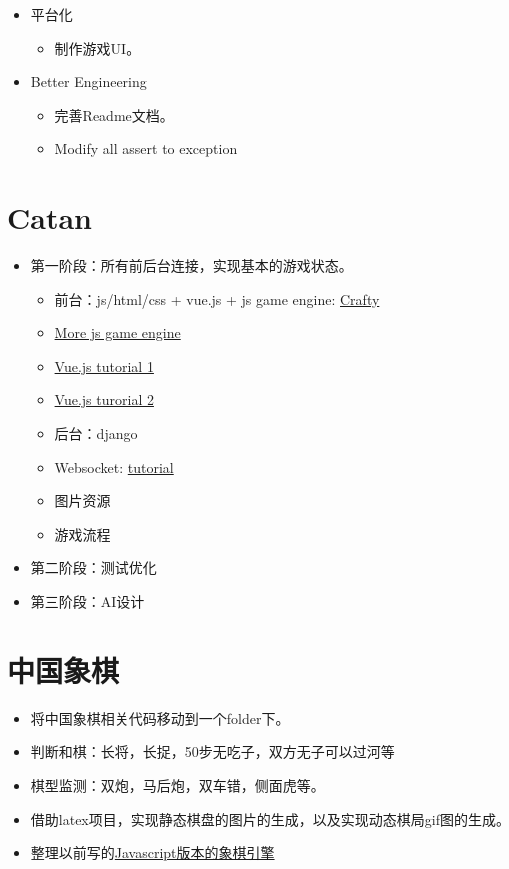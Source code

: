 \documentclass[export, 12pt, letterpaper]{ctexrep}
\begin{document}
\begin{itemize}
\item{ 平台化
\begin{itemize}
\item{ 制作游戏UI。 }
\end{itemize}
 }
\item{ Better Engineering
\begin{itemize}
\item{ 完善Readme文档。 }
\item{ Modify all assert to exception }
\end{itemize}
 }
\end{itemize}


\section{Catan}

\begin{itemize}
\item{ 第一阶段：所有前后台连接，实现基本的游戏状态。
\begin{itemize}
\item{ 前台：js/html/css + vue.js + js game engine: \href{https://github.com/craftyjs/Crafty}{Crafty} }
\item{ \href{https://github.com/collections/javascript-game-engines}{More js game engine} }
\item{ \href{https://www.youtube.com/watch?v=bI5jpueiCWw\&t=756s}{Vue.js tutorial 1} }
\item{ \href{https://www.youtube.com/watch?v=xq532yn8gMA\&t=2608s}{Vue.js turorial 2} }
\item{ 后台：django }
\item{ Websocket: \href{https://www.youtube.com/watch?v=RVH05S1qab8\&list=PLcWimtlf9naWeyuY5OwQeaRNxvxTRyTCt\&index=1\&t=3148s}{tutorial} }
\item{ 图片资源 }
\item{ 游戏流程 }
\end{itemize}
 }
\item{ 第二阶段：测试优化 }
\item{ 第三阶段：AI设计 }
\end{itemize}



\section{中国象棋}


\begin{itemize}
\item{ 将中国象棋相关代码移动到一个folder下。 }
\item{ 判断和棋：长将，长捉，50步无吃子，双方无子可以过河等 }
\item{ 棋型监测：双炮，马后炮，双车错，侧面虎等。 }
\item{ 借助latex项目，实现静态棋盘的图片的生成，以及实现动态棋局gif图的生成。 }
\item{ 整理以前写的\href{https://github.com/JimmyFromSYSU/ChineseChess}{Javascript版本的象棋引擎} }
\end{itemize}
\end{document}
